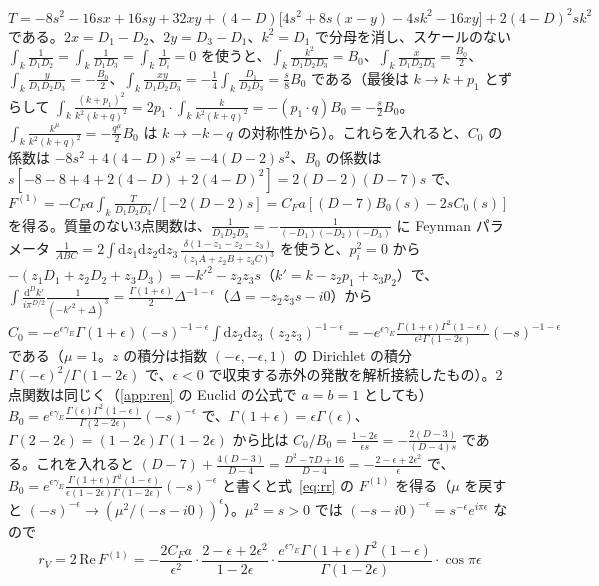 \documentclass[a4paper,10pt]{ltjsarticle}
\newcommand{\dd}{\mathrm{d}}
\begin{document}
\begin{equation*}
T=-8s^2-16sx+16sy+32xy+(4-D)\bigl[4s^2+8s(x-y)-4sk^2-16xy\bigr]+2(4-D)^2sk^2
\end{equation*}
である。$2x=D_1-D_2$、$2y=D_3-D_1$、$k^2=D_1$ で分母を消し、スケールのない $\int_k\frac1{D_1D_2}=\int_k\frac1{D_1D_3}=\int_k\frac1{D_i}=0$ を使うと、$\int_k\frac{k^2}{D_1D_2D_3}=B_0$、$\int_k\frac{x}{D_1D_2D_3}=\frac{B_0}2$、$\int_k\frac{y}{D_1D_2D_3}=-\frac{B_0}2$、$\int_k\frac{xy}{D_1D_2D_3}=-\frac14\int_k\frac{D_1}{D_2D_3}=\frac s8B_0$ である（最後は $k\to k+p_1$ とずらして $\int_k\frac{(k+p_1)^2}{k^2(k+q)^2}=2p_1\cdot\int_k\frac{k}{k^2(k+q)^2}=-(p_1\cdot q)B_0=-\frac s2B_0$。$\int_k\frac{k^\mu}{k^2(k+q)^2}=-\frac{q^\mu}2B_0$ は $k\to-k-q$ の対称性から）。これらを入れると、$C_0$ の係数は $-8s^2+4(4-D)s^2=-4(D-2)s^2$、$B_0$ の係数は $s[-8-8+4+2(4-D)+2(4-D)^2]=2(D-2)(D-7)s$ で、$F^{(1)}=-C_Fa\int_k\frac{T}{D_1D_2D_3}\big/[-2(D-2)s]=C_Fa[(D-7)B_0(s)-2sC_0(s)]$ を得る。質量のない3点関数は、$\frac1{D_1D_2D_3}=-\frac1{(-D_1)(-D_2)(-D_3)}$ に Feynman パラメータ $\frac1{ABC}=2\int\dd z_1\dd z_2\dd z_3\,\frac{\delta(1-z_1-z_2-z_3)}{(z_1A+z_2B+z_3C)^3}$ を使うと、$p_i^2=0$ から $-(z_1D_1+z_2D_2+z_3D_3)=-k'^2-z_2z_3s$（$k'=k-z_2p_1+z_3p_2$）で、$\int\frac{\dd^Dk'}{i\pi^{D/2}}\frac1{(-k'^2+\Delta)^3}=\frac{\Gamma(1+\epsilon)}2\Delta^{-1-\epsilon}$（$\Delta=-z_2z_3s-i0$）から $C_0=-e^{\epsilon\gamma_E}\Gamma(1+\epsilon)(-s)^{-1-\epsilon}\int\dd z_2\dd z_3\,(z_2z_3)^{-1-\epsilon}=-e^{\epsilon\gamma_E}\frac{\Gamma(1+\epsilon)\Gamma^2(1-\epsilon)}{\epsilon^2\Gamma(1-2\epsilon)}(-s)^{-1-\epsilon}$ である（$\mu=1$。$z$ の積分は指数 $(-\epsilon,-\epsilon,1)$ の Dirichlet の積分 $\Gamma(-\epsilon)^2/\Gamma(1-2\epsilon)$ で、$\epsilon<0$ で収束する赤外の発散を解析接続したもの）。2点関数は同じく（\ref{app:ren} の Euclid の公式で $a=b=1$ としても）$B_0=e^{\epsilon\gamma_E}\frac{\Gamma(\epsilon)\Gamma^2(1-\epsilon)}{\Gamma(2-2\epsilon)}(-s)^{-\epsilon}$ で、$\Gamma(1+\epsilon)=\epsilon\Gamma(\epsilon)$、$\Gamma(2-2\epsilon)=(1-2\epsilon)\Gamma(1-2\epsilon)$ から比は $C_0/B_0=\frac{1-2\epsilon}{\epsilon s}=-\frac{2(D-3)}{(D-4)s}$ である。これを入れると $(D-7)+\frac{4(D-3)}{D-4}=\frac{D^2-7D+16}{D-4}=-\frac{2-\epsilon+2\epsilon^2}{\epsilon}$ で、$B_0=e^{\epsilon\gamma_E}\frac{\Gamma(1+\epsilon)\Gamma^2(1-\epsilon)}{\epsilon(1-2\epsilon)\Gamma(1-2\epsilon)}(-s)^{-\epsilon}$ と書くと式~\eqref{eq:rr} の $F^{(1)}$ を得る（$\mu$ を戻すと $(-s)^{-\epsilon}\to(\mu^2/(-s-i0))^\epsilon$）。$\mu^2=s>0$ では $(-s-i0)^{-\epsilon}=s^{-\epsilon}e^{i\pi\epsilon}$ なので
\begin{equation*}
r_V=2\,\mathrm{Re}\,F^{(1)}=-\frac{2C_Fa}{\epsilon^2}\cdot\frac{2-\epsilon+2\epsilon^2}{1-2\epsilon}\cdot\frac{e^{\epsilon\gamma_E}\Gamma(1+\epsilon)\Gamma^2(1-\epsilon)}{\Gamma(1-2\epsilon)}\cdot\cos\pi\epsilon
\end{equation*}
\end{document}
